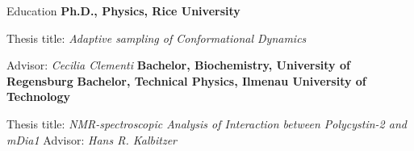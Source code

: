 \begin{rubric}{Education}
%
\entry*[2014 -- 2020]%
	\textbf{Ph.D., Physics, Rice University}
	\par Thesis title: \emph{Adaptive sampling of Conformational Dynamics}
  \par Advisor: \emph{Cecilia Clementi}
%
\entry*[2011 -- 2014]%
	\textbf{Bachelor, Biochemistry, University of Regensburg} 
%
\entry*[2011 -- 2012]%
  \textbf{Bachelor, Technical Physics, Ilmenau University of Technology}
  \par Thesis title: \emph{NMR-spectroscopic Analysis of Interaction between Polycystin-2 and mDia1}  Advisor: \emph{Hans R. Kalbitzer}
\end{rubric}
